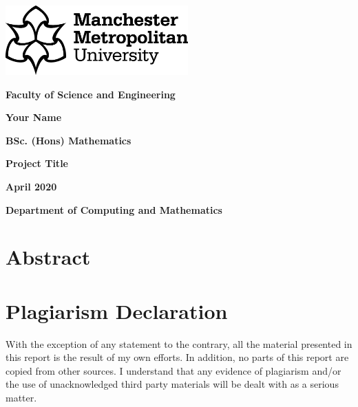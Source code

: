 \documentclass[11pt, a4paper]{report}
\newcommand{\myname}{Your Name}
\newcommand{\mycourse}{BSc. (Hons) Mathematics}
\newcommand{\projecttitle}{Project Title}
\newcommand{\publishdate}{April 2020}
\begin{document}
\thispagestyle{empty}
\begin{center}
  \vspace*{2cm}
  {\includegraphics[width = 7cm]{Images/Manchester_Met_University_Horizonal_black_logo} \par}
  \vspace{1cm}
  {\bfseries\LARGE Faculty of Science and Engineering \par}
  \vspace{1cm}
  {\bfseries\Huge \myname \par}
  {\bfseries\Large \mycourse \par}
  \vspace{1cm}
  {\bfseries\Huge \projecttitle \par}
  \vspace{1cm}
  {\bfseries\Large \publishdate \par}
  \vfill
  {\bfseries\Large Department of Computing and Mathematics \par}
  \vspace{1cm}
\end{center}

\setcounter{page}{0}

\chapter*{Abstract}
\lipsum[1-2]      %

\chapter*{Plagiarism Declaration}
With the exception of any statement to the contrary, all the material presented in this report is the result of my own efforts. In addition, no parts of this report are copied from other sources. I understand that any evidence of plagiarism and/or the use of unacknowledged third party materials will be dealt with as a serious matter.
\end{document}
